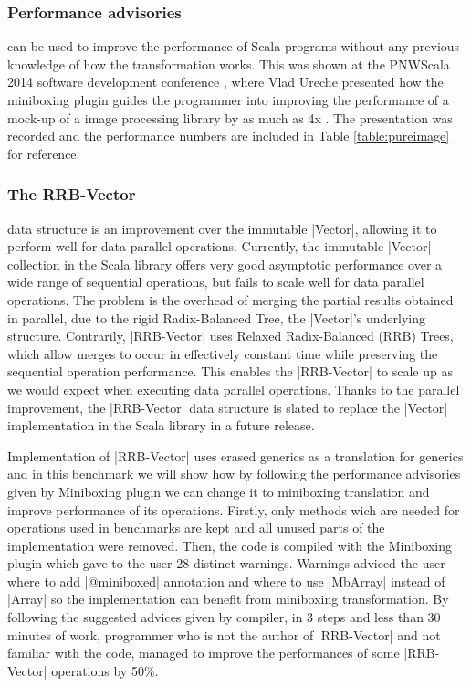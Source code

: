 \subsubsection{Performance advisories} can be used to improve the performance of Scala programs without any previous knowledge of how the transformation works. This was shown at the PNWScala 2014 software development conference \cite{pnwscala-conf}, where Vlad Ureche presented how the miniboxing plugin guides the programmer into improving the performance of a mock-up of a image processing library by as much as 4x \cite{pnwscala-pureimage}. The presentation was recorded and the performance numbers are included in Table \ref{table:pureimage} for reference.

\subsubsection{The RRB-Vector} data structure \cite{rrb-vector-paper} \cite{nicolas-thesis} is an improvement over the immutable |Vector|, allowing it to perform well for data parallel operations. Currently, the immutable |Vector| collection in the Scala library offers very good asymptotic performance over a wide range of sequential operations, but fails to scale well for data parallel operations. The problem is the overhead of merging the partial results obtained in parallel, due to the rigid Radix-Balanced Tree, the |Vector|'s underlying structure. Contrarily, |RRB-Vector| uses Relaxed Radix-Balanced (RRB) Trees, which allow merges to occur in effectively constant time while preserving the sequential operation performance. This enables the |RRB-Vector| to scale up as we would expect when executing data parallel operations. Thanks to the parallel improvement, the |RRB-Vector| data structure is slated to replace the |Vector| implementation in the Scala library in a future release.

Implementation of |RRB-Vector| uses erased generics as a translation for generics and in this benchmark we will show how by following the performance advisories given by Miniboxing plugin we can change it to miniboxing translation and improve performance of its operations. Firstly, only methods wich are needed for operations used in benchmarks are kept \cite{rrb-vector-miniboxed-impl} and all unused parts of the implementation were removed. Then, the code is compiled with the Miniboxing plugin which gave to the user 28 distinct warnings. Warnings adviced the user where to add |@miniboxed| annotation and where to use |MbArray| instead of |Array| so the implementation can benefit from miniboxing transformation. By following the suggested advices given by compiler, in 3 steps and less than 30 minutes of work, programmer who is not the author of |RRB-Vector| and not familiar with the code, managed to improve the performances of some |RRB-Vector| operations by 50\%.

